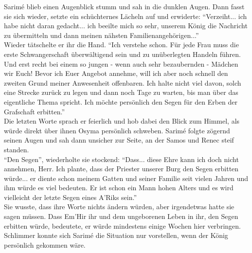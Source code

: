 Sarimé blieb einen Augenblick stumm und sah in die dunklen Augen. Dann fasst sie sich wieder, 
setzte ein schüchternes Lächeln auf und erwiderte: ``Verzeiht... ich habe nicht daran gedacht... 
ich beeilte mich so sehr, unserem König die Nachricht zu übermitteln und dann meinen nähsten 
Familienangehörigen...''\\
Wieder tätschelte er ihr die Hand. ``Ich verstehe schon. Für jede Frau muss die erste 
Schwangerschaft überwältigend sein und zu unüberlegten Handeln führen. Und erst recht bei einem so 
jungen - wenn auch sehr bezaubernden - Mädchen wir Euch! Bevor ich Euer Angebot annehme, will ich 
aber noch schnell den zweiten Grund meiner Anwesenheit offenbaren. Ich halte nicht viel davon, 
solch eine Strecke zurück zu legen und dann noch Tage zu warten, bis man über das eigentliche Thema 
spricht. Ich möchte persönlich den Segen für den Erben der Grafschaft erbitten.''\\
Die letzten Worte sprach er feierlich und hob dabei den Blick zum Himmel, als würde direkt über 
ihnen Osyma persönlich schweben. Sarimé folgte zögernd seinen Augen und sah dann unsicher zur 
Seite, an der Samos und Renec steif standen.\\
``Den Segen'', wiederholte sie stockend: ``Dass... diese Ehre kann ich doch nicht annehmen, Herr. 
Ich plante, dass der Priester unserer Burg den Segen erbitten würde... er diente schon meinem 
Gatten und seiner Familie seit vielen Jahren und ihm würde es viel bedeuten. Er ist schon ein Mann 
hohen Alters und es wird vielleicht der letzte Segen eines A'Riks sein.''\\
Sie wusste, dass ihre Worte nichts ändern würden, aber irgendetwas hatte sie sagen müssen. Dass 
Em'Hir ihr und dem ungeborenen Leben in ihr, den Segen erbitten würde, bedeutete, er würde 
mindestens einige Wochen hier verbringen. Schlimmer konnte sich Sarimé die Situation nur 
vorstellen, wenn der König persönlich gekommen wäre.



